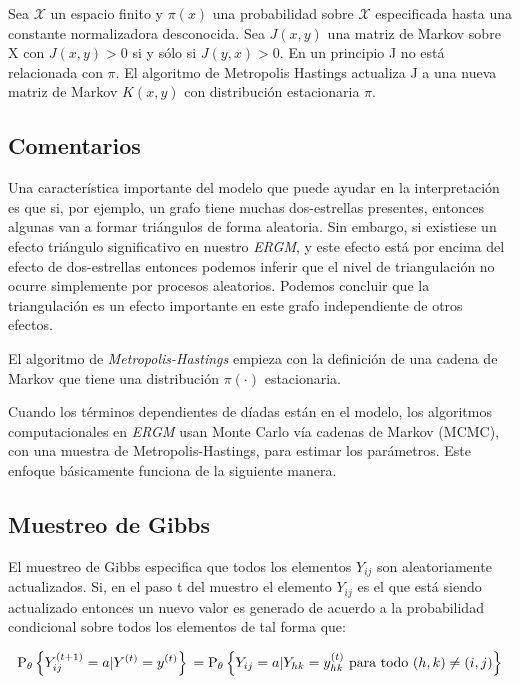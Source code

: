 Sea $\mathcal{X}$ un espacio finito y $\pi(x)$ una probabilidad sobre $\mathcal{X}$ especificada hasta una constante normalizadora desconocida. Sea $J(x,y)$ una matriz de Markov sobre X con $J(x,y) > 0$ si y sólo si $J(y,x) > 0$. En un principio J no está relacionada con $\pi$. El algoritmo de Metropolis Hastings actualiza J a una nueva matriz de Markov $K(x,y)$ con distribución estacionaria $\pi$. 

\subsection{Comentarios}
Una característica importante del modelo que puede ayudar en la interpretación es que si, por ejemplo, un grafo tiene muchas dos-estrellas presentes, entonces algunas van a formar triángulos de forma aleatoria. Sin embargo, si existiese un efecto triángulo significativo en nuestro \textit{ERGM}, y este efecto está por encima del efecto de dos-estrellas entonces podemos inferir que el nivel de triangulación no ocurre simplemente por procesos aleatorios. Podemos concluir que la triangulación es un efecto importante en este grafo independiente de otros efectos.

El algoritmo de \textit{Metropolis-Hastings} empieza con la definición de una cadena de Markov que tiene una distribución $\pi(\cdot)$ estacionaria.

Cuando los términos dependientes de díadas están en el modelo, los algoritmos computacionales en \textit{ERGM} usan Monte Carlo vía cadenas de Markov (MCMC), con una muestra de Metropolis-Hastings, para estimar los parámetros. Este enfoque básicamente funciona de la siguiente manera.
\subsection{Muestreo de Gibbs}

El muestreo de Gibbs especifica que todos los elementos $Y_{ij}$ son aleatoriamente actualizados. Si, en el paso t del muestro el elemento $Y_{ij}$ es el que está siendo actualizado entonces un nuevo valor es generado de acuerdo a la probabilidad condicional sobre todos los elementos de tal forma que:

\begin{equation}
    \mathrm{P}_{\theta}\left\{Y_{i j}^{(t+1)}=a | Y^{(t)}=y^{(t)}\right\}\\
    
= \mathrm{P}_{\theta}\left\{Y_{i j}=a | Y_{h k}=y_{h k}^{(t)} \text { para todo }(h, k) \neq(i, j)\right\}
\end{equation}

